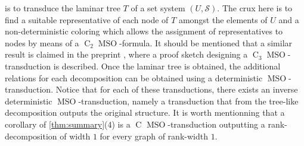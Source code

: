 \documentclass{lmcs} %
\newcommand{\MSO}{\ensuremath{\operatorname{MSO}}\xspace}
\newcommand{\CMSO}[1][]{\ensuremath{\C[#1]{\!\!}\MSO}\xspace}
\newcommand{\C}[1][]{\ensuremath{\operatorname{C}_{#1}}\xspace}
\begin{document}
is to transduce the laminar tree $T$ of a set system $(U,\mathcal{S})$.
The crux here is to find a suitable representative of each node of $T$ amongst the elements of $U$
and a non-deterministic coloring which allows the assignment of representatives to nodes by means of a \CMSO[2]-formula.
It should be mentioned that a similar result is claimed in the preprint \cite{Boj23},
where a proof sketch designing a \CMSO[3]-transduction is described.
%
Once the laminar tree is obtained,
the additional relations for each decomposition
can be obtained using a deterministic \MSO-transduction.
Notice that for each of these transductions,
there exists an inverse deterministic \MSO-transduction,
namely a transduction that from the tree-like decomposition outputs the original structure. It is worth mentionning that a corollary of
\autoref{thm:summary}(4) is a \CMSO-transduction outputting a rank-decomposition of width $1$ for every graph of rank-width $1$. 
\end{document}
